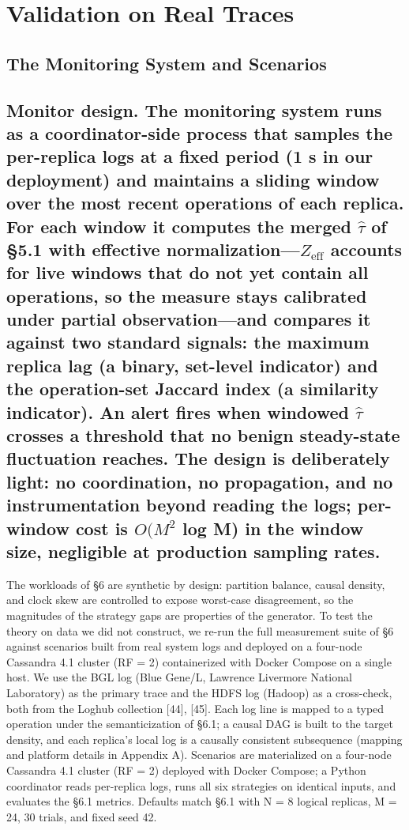 \documentclass[11pt]{article}
\begin{document}
\section{Validation on Real Traces}
\subsection{The Monitoring System and Scenarios}
\subsection{Monitor design. The monitoring system runs as a coordinator-side process that samples the per-replica logs at a fixed period (1 s in our deployment) and maintains a sliding window over the most recent operations of each replica. For each window it computes the merged $\hat{\tau}$ of §5.1 with effective normalization—$Z_{\mathrm{eff}}$ accounts for live windows that do not yet contain all operations, so the measure stays calibrated under partial observation—and compares it against two standard signals: the maximum replica lag (a binary, set-level indicator) and the operation-set Jaccard index (a similarity indicator). An alert fires when windowed $\hat{\tau}$ crosses a threshold that no benign steady-state fluctuation reaches. The design is deliberately light: no coordination, no propagation, and no instrumentation beyond reading the logs; per-window cost is $O(M^{2}$ log M) in the window size, negligible at production sampling rates.}
The workloads of §6 are synthetic by design: partition balance, causal density, and clock skew are controlled to expose worst-case disagreement, so the magnitudes of the strategy gaps are properties of the generator. To test the theory on data we did not construct, we re-run the full measurement suite of §6 against scenarios built from real system logs and deployed on a four-node Cassandra 4.1 cluster (RF = 2) containerized with Docker Compose on a single host. We use the BGL log (Blue Gene/L, Lawrence Livermore National Laboratory) as the primary trace and the HDFS log (Hadoop) as a cross-check, both from the Loghub collection [44], [45]. Each log line is mapped to a typed operation under the semanticization of §6.1; a causal DAG is built to the target density, and each replica's local log is a causally consistent subsequence (mapping and platform details in Appendix A). Scenarios are materialized on a four-node Cassandra 4.1 cluster (RF = 2) deployed with Docker Compose; a Python coordinator reads per-replica logs, runs all six strategies on identical inputs, and evaluates the §6.1 metrics. Defaults match §6.1 with N = 8 logical replicas, M = 24, 30 trials, and fixed seed 42.
\end{document}
